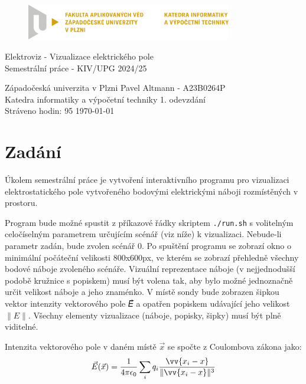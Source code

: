 \documentclass[12pt,a4paper]{paper}
\newcommand{\code}[1]{\texttt{#1}}
\begin{document}
\begin{figure}[H]
	\centering
	\includegraphics[width=0.8\textwidth]{pic/kiv-cmyk-cz}
\end{figure}

\begin{center}
	\vspace{.5cm}
	\LARGE{Elektroviz - Vizualizace elektrického pole}\\
	\large{Semestrální práce - KIV/UPG 2024/25}
\end{center}

\vfill

\noindent
Západočeská univerzita v Plzni \hfill Pavel Altmann - A23B0264P\\
Katedra informatiky a výpočetní techniky \hfill 1. odevzdání\\
Stráveno hodin: 95 \hfill \today
\thispagestyle{empty}

\newpage
\setcounter{page}{1}

\tableofcontents

\newpage

\section{Zadání}

Úkolem semestrální práce je vytvoření interaktivního programu pro vizualizaci
elektrostatického pole vytvořeného bodovými elektrickými náboji rozmístěných v
prostoru.

Program bude možné spustit z příkazové řádky skriptem \code{./run.sh} s
volitelným celočíselným parametrem určujícím scénář (viz níže) k vizualizaci.
Nebude-li parametr zadán, bude zvolen scénář 0. Po spuštění programu se zobrazí
okno o minimální počáteční velikosti 800x600px, ve kterém se zobrazí přehledně
všechny bodové náboje zvoleného scénáře. Vizuální reprezentace náboje (v
nejjednodušší podobě kružnice s popiskem) musí být volena tak, aby bylo možné
jednoznačně určit velikost náboje a jeho znaménko. V místě sondy bude zobrazen
šipkou vektor intenzity vektorového pole 𝐸⃗ a opatřen popiskem udávající jeho
velikost $\|E\|$. Všechny elementy vizualizace (náboje, popisky, šipky) musí být
plně viditelné.

Intenzita vektorového pole v daném místě $\vec{x}$ se spočte
z Coulombova zákona jako:
\[ \vec{E}(\vec{x}) = \frac{1}{4 \pi \epsilon_0}
\sum_i q_i \frac{\vv{x_i - x}}{\|\vv{x_i - x}\|^3} \]
\end{document}
